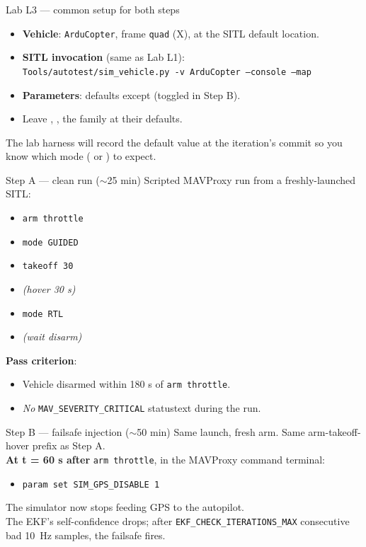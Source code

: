 \documentclass[aspectratio=169,11pt]{beamer}
\begin{document}
\begin{frame}{Lab L3 --- common setup for both steps}
  \begin{itemize}
    \item \textbf{Vehicle}: \texttt{ArduCopter}, frame \texttt{quad} (X), at the SITL default location.
    \item \textbf{SITL invocation} (same as Lab L1):\\
      \texttt{Tools/autotest/sim\_vehicle.py -v ArduCopter --console --map}
    \item \textbf{Parameters}: defaults except  (toggled in Step B).
    \item Leave , , the  family at their defaults.
  \end{itemize}
  The lab harness will record the  default value at the iteration's commit so you know which mode ( or ) to expect.
\end{frame}

\begin{frame}{Step A --- clean run ($\sim$25 min)}
  Scripted MAVProxy run from a freshly-launched SITL:
  \begin{itemize}
    \item[\texttt{>}] \texttt{arm throttle}
    \item[\texttt{>}] \texttt{mode GUIDED}
    \item[\texttt{>}] \texttt{takeoff 30}
    \item[\texttt{>}] \emph{(hover 30 s)}
    \item[\texttt{>}] \texttt{mode RTL}
    \item[\texttt{>}] \emph{(wait disarm)}
  \end{itemize}
  \textbf{Pass criterion}:
  \begin{itemize}
    \item Vehicle disarmed within 180 s of \texttt{arm throttle}.
    \item \emph{No} \texttt{MAV\_SEVERITY\_CRITICAL} statustext during the run.
  \end{itemize}
\end{frame}

\begin{frame}{Step B --- failsafe injection ($\sim$50 min)}
  Same launch, fresh arm. Same arm-takeoff-hover prefix as Step A.\\[1ex]
  \textbf{At t = 60 s after} \texttt{arm throttle}, in the MAVProxy command terminal:
  \begin{itemize}
    \item[\texttt{>}] \texttt{param set SIM\_GPS\_DISABLE 1}
  \end{itemize}
  The simulator now stops feeding GPS to the autopilot.\\
  The EKF's self-confidence drops; after \texttt{EKF\_CHECK\_ITERATIONS\_MAX} consecutive bad 10~Hz samples, the failsafe fires.
\end{frame}
\end{document}
